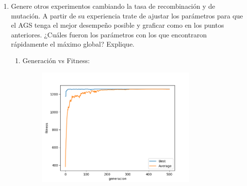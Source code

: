 \documentclass[11pt,letterpaper]{article}
\begin{document}
\begin{enumerate}[label=\alph*)]
        \item Genere otros experimentos cambiando la tasa de recombinación y de mutación. A partir de su experiencia trate de ajustar los parámetros para que el AGS tenga el mejor desempeño posible y graficar como en los puntos anteriores. ¿Cuáles fueron los parámetros con los que encontraron rápidamente el máximo global? Explique.

        \begin{enumerate}[label=\arabic*.]
            \item Generación vs Fitness:
            \begin{figure}[H]
                \centering
                \includegraphics[width=8cm]{images/parametros-ajustados/parametros-gen-vs-fitness.png}
                \label{fig:parametros-gen-vs-fit}
            \end{figure}


\end{enumerate}
\end{enumerate}
\end{document}
